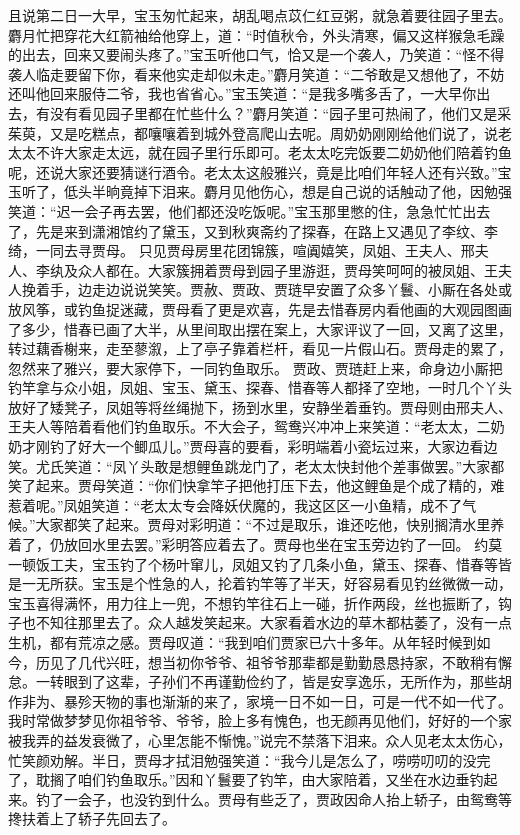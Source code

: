 \documentclass[12pt,oneside]{book}
\begin{document}
且说第二日一大早，宝玉匆忙起来，胡乱喝点苡仁红豆粥，就急着要往园子里去。麝月忙把穿花大红箭袖给他穿上，道：“时值秋令，外头清寒，偏又这样猴急毛躁的出去，回来又要闹头疼了。”宝玉听他口气，恰又是一个袭人，乃笑道：“怪不得袭人临走要留下你，看来他实走却似未走。”麝月笑道：“二爷敢是又想他了，不妨还叫他回来服侍二爷，我也省省心。”宝玉笑道：“是我多嘴多舌了，一大早你出去，有没有看见园子里都在忙些什么？”麝月笑道：“园子里可热闹了，他们又是采茱萸，又是吃糕点，都嚷嚷着到城外登高爬山去呢。周奶奶刚刚给他们说了，说老太太不许大家走太远，就在园子里行乐即可。老太太吃完饭要二奶奶他们陪着钓鱼呢，还说大家还要猜谜行酒令。老太太这般雅兴，竟是比咱们年轻人还有兴致。”宝玉听了，低头半晌竟掉下泪来。麝月见他伤心，想是自己说的话触动了他，因勉强笑道：“迟一会子再去罢，他们都还没吃饭呢。”宝玉那里憋的住，急急忙忙出去了，先是来到潇湘馆约了黛玉，又到秋爽斋约了探春，在路上又遇见了李纹、李绮，一同去寻贾母。
只见贾母房里花团锦簇，喧阗嬉笑，凤姐、王夫人、邢夫人、李纨及众人都在。大家簇拥着贾母到园子里游逛，贾母笑呵呵的被凤姐、王夫人挽着手，边走边说说笑笑。贾赦、贾政、贾琏早安置了众多丫鬟、小厮在各处或放风筝，或钓鱼捉迷藏，贾母看了更是欢喜，先是去惜春房内看他画的大观园图画了多少，惜春已画了大半，从里间取出摆在案上，大家评议了一回，又离了这里，转过藕香榭来，走至蓼溆，上了亭子靠着栏杆，看见一片假山石。贾母走的累了，忽然来了雅兴，要大家停下，一同钓鱼取乐。
贾政、贾琏赶上来，命身边小厮把钓竿拿与众小姐，凤姐、宝玉、黛玉、探春、惜春等人都择了空地，一时几个丫头放好了矮凳子，凤姐等将丝绳抛下，扬到水里，安静坐着垂钓。贾母则由邢夫人、王夫人等陪着看他们钓鱼取乐。不大会子，鸳鸯兴冲冲上来笑道：“老太太，二奶奶才刚钓了好大一个鲫瓜儿。”贾母喜的要看，彩明端着小瓷坛过来，大家边看边笑。尤氏笑道：“凤丫头敢是想鲤鱼跳龙门了，老太太快封他个差事做罢。”大家都笑了起来。贾母笑道：“你们快拿竿子把他打压下去，他这鲤鱼是个成了精的，难惹着呢。”凤姐笑道：“老太太专会降妖伏魔的，我这区区一小鱼精，成不了气候。”大家都笑了起来。贾母对彩明道：“不过是取乐，谁还吃他，快别搁清水里养着了，仍放回水里去罢。”彩明答应着去了。贾母也坐在宝玉旁边钓了一回。
约莫一顿饭工夫，宝玉钓了个杨叶窜儿，凤姐又钓了几条小鱼，黛玉、探春、惜春等皆是一无所获。宝玉是个性急的人，抡着钓竿等了半天，好容易看见钓丝微微一动，宝玉喜得满怀，用力往上一兜，不想钓竿往石上一碰，折作两段，丝也振断了，钩子也不知往那里去了。众人越发笑起来。大家看着水边的草木都枯萎了，没有一点生机，都有荒凉之感。贾母叹道：“我到咱们贾家已六十多年。从年轻时候到如今，历见了几代兴旺，想当初你爷爷、祖爷爷那辈都是勤勤恳恳持家，不敢稍有懈怠。一转眼到了这辈，子孙们不再谨勤俭约了，皆是安享逸乐，无所作为，那些胡作非为、暴殄天物的事也渐渐的来了，家境一日不如一日，可是一代不如一代了。我时常做梦梦见你祖爷爷、爷爷，脸上多有愧色，也无颜再见他们，好好的一个家被我弄的益发衰微了，心里怎能不惭愧。”说完不禁落下泪来。众人见老太太伤心，忙笑颜劝解。半日，贾母才拭泪勉强笑道：“我今儿是怎么了，唠唠叨叨的没完了，耽搁了咱们钓鱼取乐。”因和丫鬟要了钓竿，由大家陪着，又坐在水边垂钓起来。钓了一会子，也没钓到什么。贾母有些乏了，贾政因命人抬上轿子，由鸳鸯等搀扶着上了轿子先回去了。
\end{document}
